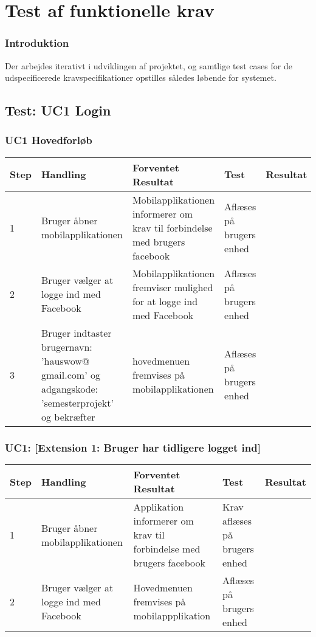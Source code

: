 \chapter{Test af funktionelle krav}
 \label{chp:testfunktionelle}

\subsection{Introduktion}
Der arbejdes iterativt i udviklingen af projektet, og samtlige test cases for de udspecificerede kravspecifikationer opstilles således løbende for systemet.  


\section{Test: UC1 Login}

\subsection{UC1 Hovedforløb }


\begin{longtable}{| p{0.7cm}  | p{3cm}  | p{4cm} |  p{3cm}  | p{3cm}  |}
\hline
Step & Handling & Forventet Resultat & Test & Resultat \\
\hline
1 & Bruger åbner mobilapplikationen  & Mobilapplikationen informerer om krav til forbindelse med brugers facebook & Aflæses på brugers enhed & \FuckingHuge{\checkmark} \\
\hline
2 & Bruger vælger at logge ind med Facebook  & Mobilapplikationen fremviser mulighed for at logge ind med Facebook & Aflæses på brugers enhed & \FuckingHuge{\checkmark} \\
\hline
3 & Bruger indtaster brugernavn: 'hauswow@ gmail.com' og adgangskode: 'semesterprojekt' og bekræfter & hovedmenuen fremvises på mobilapplikationen  & Aflæses på brugers enhed  & \FuckingHuge{\checkmark} \\
\hline
\end{longtable}


\subsection{UC1: [Extension 1: Bruger har tidligere logget ind]}

\begin{longtable}{| p{0.7cm}  | p{3cm}  | p{4cm} |  p{3cm}  | p{3cm}  |}
\hline
Step & Handling & Forventet Resultat & Test & Resultat \\
\hline
1 & Bruger åbner mobilapplikationen  & Applikation informerer om krav til forbindelse med brugers facebook & Krav aflæses på brugers enhed & \FuckingHuge{\checkmark} \\
\hline
2 & Bruger vælger at logge ind med Facebook  & Hovedmenuen fremvises på mobilappplikation & Aflæses på brugers enhed & \FuckingHuge{\checkmark}\\
\hline
\end{longtable}




